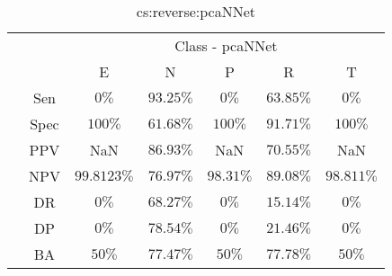 \begin{table}[!ht]
	\centering
	\begin{tabular}{|c|c|c|c|c|c|c|}
		\cline{3-7}
		\multicolumn{2}{c|}{} & \multicolumn{5}{c|}{Class - pcaNNet} \\ \cline{3-7}
		\multicolumn{2}{c|}{} & E & N & P & R & T \\ \hline
		\multirow{7}{*}{\rotatebox{90}{Statistics}} & Sen & $0\%$ & $93.25\%$ & $0\%$ & $63.85\%$ & $0\%$ \\ \cline{2-7}
		 & Spec & $100\%$ & $61.68\%$ & $100\%$ & $91.71\%$ & $100\%$ \\ \cline{2-7}
		 & PPV & NaN & $86.93\%$ & NaN & $70.55\%$ & NaN \\ \cline{2-7}
		 & NPV & $99.8123\%$ & $76.97\%$ & $98.31\%$ & $89.08\%$ & $98.811\%$ \\ \cline{2-7}
		 & DR & $0\%$ & $68.27\%$ & $0\%$ & $15.14\%$ & $0\%$ \\ \cline{2-7}
		 & DP & $0\%$ & $78.54\%$ & $0\%$ & $21.46\%$ & $0\%$ \\ \cline{2-7}
		 & BA & $50\%$ & $77.47\%$ & $50\%$ & $77.78\%$ & $50\%$ \\ \hline
	\end{tabular}
	\caption{cs:reverse:pcaNNet}
	\label{tab:cs:reverse:pcaNNet}
\end{table}
